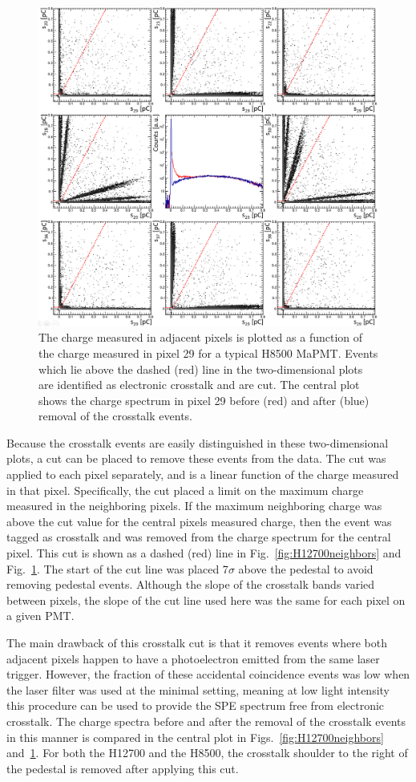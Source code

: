 \begin{figure}[h!bt]
    \centering
	\includegraphics[width=0.9\linewidth]{figures/H8500_ct_v2.png}
	\caption{The charge measured in adjacent pixels is plotted as a function of the charge measured in pixel 29 for a typical H8500 MaPMT. Events which lie above the dashed (red) line in the two-dimensional plots are identified as electronic crosstalk and are cut. The central plot shows the charge spectrum in pixel 29 before (red) and after (blue) removal of the crosstalk events.}
	\label{fig:H8500neighbors}
\end{figure}

Because the crosstalk events are easily distinguished in these two-dimensional plots, a cut can be placed to remove these events from the data. The cut was applied to each pixel separately, and is a linear function of the charge measured in that pixel. Specifically, the cut placed a limit on the maximum charge measured in the neighboring pixels. If the maximum neighboring charge was above the cut value for the central pixel\textquotesingle s measured charge, then the event was tagged as crosstalk and was removed from the charge spectrum for the central pixel. This cut is shown as a dashed (red) line in Fig.~\ref{fig:H12700neighbors} and Fig.~\ref{fig:H8500neighbors}. The start of the cut line was placed 7$\sigma$ above the pedestal to avoid removing pedestal events. Although the slope of the crosstalk bands varied between pixels, the slope of the cut line used here was the same for each pixel on a given PMT. 

The main drawback of this crosstalk cut is that it removes events where both adjacent pixels  happen to have a photoelectron emitted from the same laser trigger. However, the fraction of these accidental coincidence events was low when the laser filter was used at the minimal setting, meaning at low light intensity this procedure can be used to provide the SPE spectrum free from electronic crosstalk. The charge spectra before and after the removal of the crosstalk events in this manner is compared in the central plot in Figs.~\ref{fig:H12700neighbors} and~\ref{fig:H8500neighbors}. For both the H12700 and the H8500, the crosstalk shoulder to the right of the pedestal is removed after applying this cut. 
